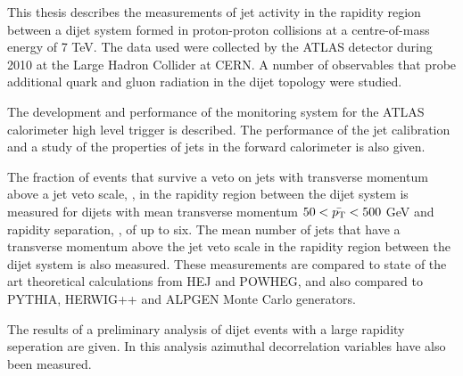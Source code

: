 This thesis describes the measurements of jet activity in the rapidity region between a dijet system formed in proton-proton collisions at a centre-of-mass energy of 7 TeV.
The data used were collected by the ATLAS detector during 2010 at the Large Hadron Collider at CERN.
A number of observables that probe additional quark and gluon radiation in the dijet topology were studied.

The development and performance of the monitoring system for the ATLAS calorimeter high level trigger is described.
The performance of the jet calibration and a study of the properties of jets in the forward calorimeter is also given.

The fraction of events that survive a veto on jets with transverse momentum above a jet veto scale, \qz{}, in the rapidity region between the dijet system is measured for dijets with mean transverse momentum $50<\mbox{$\bar{p_{\rm T}}$}{}<500$ GeV and rapidity separation, \dy{}, of up to six.
The mean number of jets that have a transverse momentum above the jet veto scale in the rapidity region between the dijet system is also measured. 
These measurements are compared to state of the art theoretical calculations from HEJ and POWHEG, and also compared to PYTHIA, HERWIG++ and ALPGEN Monte Carlo generators.

The results of a preliminary analysis of dijet events with a large rapidity seperation are given.
In this analysis azimuthal decorrelation variables have also been measured.
